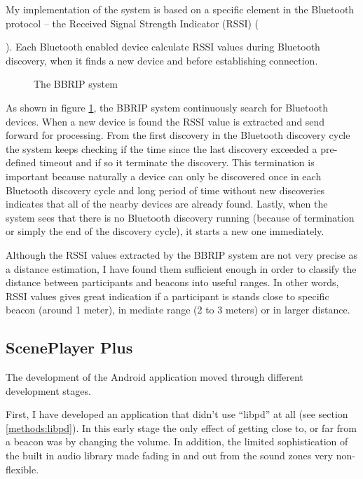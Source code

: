 \documentclass[a4paper,11pt]{article}
\begin{document}
My implementation of the system is based on a specific element in the Bluetooth protocol -- the Received Signal Strength Indicator (RSSI) ({\cite{bray12}).
Each Bluetooth enabled device calculate RSSI values during Bluetooth discovery, when it finds a new device and before establishing connection.

\begin{figure}[!htb]
	\centering
	\def\svgwidth{\columnwidth}
  	
	\caption{The BBRIP system}\label{fig:bbrip}
\end{figure}

As shown in figure \ref{fig:bbrip}, the BBRIP system continuously search for Bluetooth devices.
When a new device is found the RSSI value is extracted and send forward for processing.
From the first discovery in the Bluetooth discovery cycle the system keeps checking if the time since the last discovery exceeded a pre-defined timeout and if so it terminate the discovery.
This termination is important because naturally a device can only be discovered once in each Bluetooth discovery cycle and long period of time without new discoveries indicates that all of the nearby devices are already found.
Lastly, when the system sees that there is no Bluetooth discovery running (because of termination or simply the end of the discovery cycle), it starts a new one immediately.

Although the RSSI values extracted by the BBRIP system are not very precise as a distance estimation, I have found them sufficient enough in order to classify the distance between participants and beacons into useful ranges. In other words, RSSI values gives great indication if a participant is stands close to specific beacon (around 1 meter), in mediate range (2 to 3 meters) or in larger distance.

\subsection{ScenePlayer Plus}\label{sceneplayer_plus}

The development of the Android application moved through different development stages.

First, I have developed an application that didn't use ``libpd'' at all (see section \ref{methods:libpd}).
In this early stage the only effect of getting close to, or far from a beacon was by changing the volume.
In addition, the limited sophistication of the built in audio library made fading in and out from the sound zones very non-flexible.

}
\end{document}
